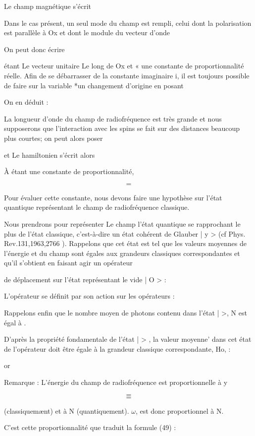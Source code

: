 Le champ magnétique  s'écrit

Dans le cas présent, un seul mode du champ est rempli, celui dont la polarisation
est parallèle à Ox et dont le module du vecteur d'onde

On peut donc écrire

étant Le vecteur unitaire Le long de Ox et « une constante de proportionnalité
réelle. Afin de se débarrasser de la constante imaginaire i, il est toujours
possible de faire sur la variable *un changement d'origine en posant

On en déduit :

La longueur d'onde du champ de radiofréquence est très grande et nous supposerons
que l'interaction avec les spins se fait sur des distances beaucoup plus courtes;
 on peut alors poser 

et 
Le hamiltonien  s'écrit alors

À étant une constante de proportionnalité,


\[
\tag{49}=
\]

Pour évaluer cette constante, nous devons faire une hypothèse sur
l'état quantique représentant le champ de radiofréquence classique.

Nous prendrons pour représenter Le champ l'état quantique se rapprochant le plus de l'état
classique, c'est-à-dire un état cohérent de
Glauber | y > (cf Phys. Rev.131,1963,2766 ). Rappelons que cet état est tel
que les valeurs moyennes de l'énergie et du champ sont égales aux grandeurs
classiques correspondantes et qu'il s'obtient en faisant agir un opérateur

de déplacement  sur l'état représentant le vide | O > :

L'opérateur  se définit par son action sur les opérateurs  :

Rappelons enfin que le nombre moyen de photons contenu dans l'état |  >,
N est égal à .

D'après la propriété fondamentale de l'état |  > , la valeur moyenne’ dans cet état de
l'opérateur  doit être égale à la grandeur classique correspondante, Ho, :

or

Remarque : L'énergie du champ de radiofréquence est proportionnelle à y

\[
\tag{50-a}=
\]
\[
\tag{50-b}=
\]

(classiquemænt) et à N (quantiquement). $\omega$, est donc proportionnel à N.

C'est cette proportionnalité que traduit la formule (49) :

